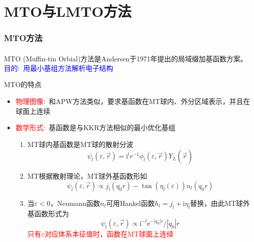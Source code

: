 \documentclass[cjk,slidestop,compress,mathserif,blue]{beamer}
\newcommand{\upcite}[1]{\hspace{0ex}\textsuperscript{\cite{#1}}} %
\begin{document}
\section{MTO与LMTO方法}
\frame
{
\frametitle{\textrm{MTO}方法}
\textrm{MTO (Muffin-tin Orbial)}方法是\textrm{Andersen}于\textrm{1971}年提出的局域缀加基函数方案\upcite{Andersen_Book}。
\textcolor{blue}{目的:~用最小基组方法解析电子结构}

\textrm{MTO}的特点
\begin{itemize}
	\item \textcolor{red}{物理图像}:~和\textrm{APW}方法类似，要求基函数在\textrm{MT}球内、外分区域表示，并且在球面上连续
	\item \textcolor{red}{数学形式}:~基函数是与\textrm{KKR}方法相似的最小优化基组
		\begin{enumerate}
			\item \textrm{MT}球内基函数是\textrm{MT}球的散射分波 
				$$\psi_l(\varepsilon,\vec r)=\mathrm{i}^lr^{-1}\phi_l(\varepsilon,\vec r)Y_L(\hat{\vec r})$$
			\item \textrm{MT}根据散射理论，\textrm{MT}球外基函数形如$$\psi_l(\varepsilon,\vec r)\propto j_l(q_0r)-\tan(\eta_l(\varepsilon))n_l(q_0r)$$
			\item 当$\varepsilon<0$，\textrm{Neumann}函数$n_l$可用\textrm{Hankel}函数$h_l=j_l+\mathrm{i}\eta_l$替换，由此\textrm{MT}球外基函数形式为$$\psi_l(\varepsilon,\vec r)\propto\mathrm{i}^{-l}\mathrm{e}^{-|q_0|r}/|q_0|r$$
				\textcolor{red}{只有$\varepsilon$对应体系本征值时，函数在\textrm{MT}球面上连续}
		\end{enumerate}
\end{itemize}

}
\end{document}
